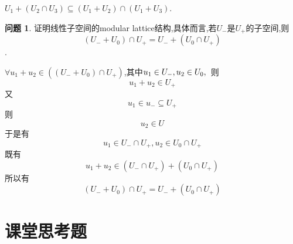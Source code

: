 \documentclass[11pt]{ctexart}
\theoremstyle{definition}
\newtheorem{qqq}{问题}[section]
\numberwithin{equation}{section}
\begin{document}
\begin{aaa}
    $U_1+(U_2 \cap U_3)\subseteq (U_1 + U_2)\cap (U_1 + U_3)$. 
\end{aaa}
\begin{qqq}
    证明线性子空间的modular lattice结构,具体而言,若$U_-$是$U_+$的子空间,则
    $$(U_-+U_0)\cap U_+=U_-+(U_0 \cap U_+)$$.
\end{qqq}
\begin{aaa}
    $\forall u_1+u_2 \in ((U_-+U_0)\cap U_+)$,其中$u_1\in U_-,u_2 \in U_0,\\$
    则$$u_1+u_2\in U_+$$\newline
    又$$u_1 \in u_- \subseteq U_+$$\newline
    则$$u_2 \in U$$\newline
    于是有$$u_1 \in U_- \cap U_+ ,u_2 \in U_0 \cap U_+$$\newline
    既有$$u_1+u_2\in (U_- \cap U_+)+(U_0 \cap U_+)$$\newline
    所以有$$(U_-+U_0)\cap U_+=U_-+(U_0 \cap U_+)$$
\end{aaa}
\section{课堂思考题}
\end{document}
